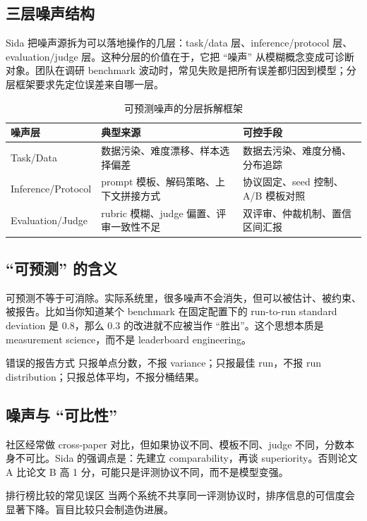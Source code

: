 \documentclass[a4paper]{article}
\begin{document}
\subsection{三层噪声结构}
Sida 把噪声源拆为可以落地操作的几层：task/data 层、inference/protocol 层、evaluation/judge 层。这种分层的价值在于，它把 ``噪声'' 从模糊概念变成可诊断对象。团队在调研 benchmark 波动时，常见失败是把所有误差都归因到模型；分层框架要求先定位误差来自哪一层。

\begin{table}[H]
\centering
\begin{tabular}{p{3.2cm}p{4.2cm}p{4.2cm}}
\toprule
\textbf{噪声层} & \textbf{典型来源} & \textbf{可控手段} \\
\midrule
Task/Data & 数据污染、难度漂移、样本选择偏差 & 数据去污染、难度分桶、分布追踪 \\
Inference/Protocol & prompt 模板、解码策略、上下文拼接方式 & 协议固定、seed 控制、A/B 模板对照 \\
Evaluation/Judge & rubric 模糊、judge 偏置、评审一致性不足 & 双评审、仲裁机制、置信区间汇报 \\
\bottomrule
\end{tabular}
\caption{可预测噪声的分层拆解框架}
\end{table}

\subsection{``可预测'' 的含义}
可预测不等于可消除。实际系统里，很多噪声不会消失，但可以被估计、被约束、被报告。比如当你知道某个 benchmark 在固定配置下的 run-to-run standard deviation 是 $0.8$，那么 $0.3$ 的改进就不应被当作 ``胜出''。这个思想本质是 measurement science，而不是 leaderboard engineering。

\begin{importantbox}{错误的报告方式}
只报单点分数，不报 variance；只报最佳 run，不报 run distribution；只报总体平均，不报分桶结果。
\end{importantbox}

\subsection{噪声与 ``可比性''}
社区经常做 cross-paper 对比，但如果协议不同、模板不同、judge 不同，分数本身不可比。Sida 的强调点是：先建立 comparability，再谈 superiority。否则论文 A 比论文 B 高 1 分，可能只是评测协议不同，而不是模型变强。

\begin{warningbox}{排行榜比较的常见误区}
当两个系统不共享同一评测协议时，排序信息的可信度会显著下降。盲目比较只会制造伪进展。
\end{warningbox}
\end{document}

